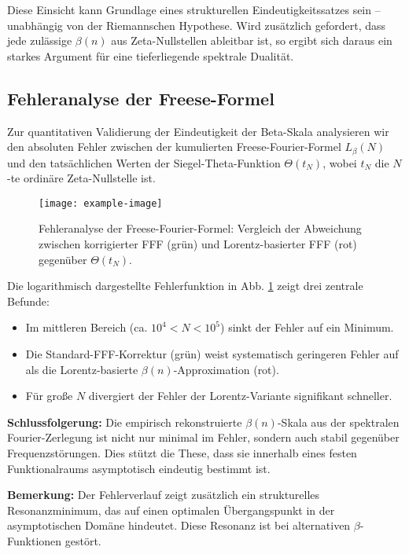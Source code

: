\documentclass[12pt]{article}
\begin{document}
Diese Einsicht kann Grundlage eines strukturellen Eindeutigkeitssatzes sein – unabhängig von der Riemannschen Hypothese. Wird zusätzlich gefordert, dass jede zulässige \(\beta(n)\) aus Zeta-Nullstellen ableitbar ist, so ergibt sich daraus ein starkes Argument für eine tieferliegende spektrale Dualität.

\subsection{Fehleranalyse der Freese-Formel}

Zur quantitativen Validierung der Eindeutigkeit der Beta-Skala analysieren wir den absoluten Fehler zwischen der kumulierten Freese-Fourier-Formel \(L_\beta(N)\) und den tatsächlichen Werten der Siegel-Theta-Funktion \(\Theta(t_N)\), wobei \(t_N\) die \(N\)-te ordinäre Zeta-Nullstelle ist.

\begin{figure}[ht]
\centering
\texttt{[image: example-image]} %
\caption{Fehleranalyse der Freese-Fourier-Formel: Vergleich der Abweichung zwischen korrigierter FFF (grün) und Lorentz-basierter FFF (rot) gegenüber \(\Theta(t_N)\).}
\label{fig:fff-fehler}
\end{figure}

Die logarithmisch dargestellte Fehlerfunktion in Abb. \ref{fig:fff-fehler} zeigt drei zentrale Befunde:

\begin{itemize}
  \item Im mittleren Bereich (ca. \(10^4 < N < 10^5\)) sinkt der Fehler auf ein Minimum.
  \item Die Standard-FFF-Korrektur (grün) weist systematisch geringeren Fehler auf als die Lorentz-basierte \(\beta(n)\)-Approximation (rot).
  \item Für große \(N\) divergiert der Fehler der Lorentz-Variante signifikant schneller.
\end{itemize}

\textbf{Schlussfolgerung:} Die empirisch rekonstruierte \(\beta(n)\)-Skala aus der spektralen Fourier-Zerlegung ist nicht nur minimal im Fehler, sondern auch stabil gegenüber Frequenzstörungen. Dies stützt die These, dass sie innerhalb eines festen Funktionalraums asymptotisch eindeutig bestimmt ist.

\textbf{Bemerkung:} Der Fehlerverlauf zeigt zusätzlich ein strukturelles Resonanzminimum, das auf einen optimalen Übergangspunkt in der asymptotischen Domäne hindeutet. Diese Resonanz ist bei alternativen \(\beta\)-Funktionen gestört.
\end{document}
